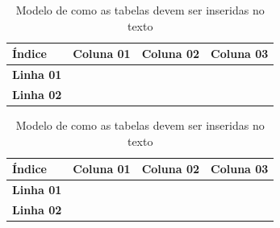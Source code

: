 \begin{table}[h]
\centering
\caption{ Modelo de como as tabelas devem ser inseridas no texto }
\vspace{0.2in}
%
\newcommand{\rowstyle}[1]{%
  \protected\gdef\currentrowstyle{#1}%
}
\begin{tabularx}{\textwidth}{>{\bf}C|C|C|C}
\hline 
\textbf {Índice} & \textbf{Coluna 01} &\textbf{ Coluna 02} & \textbf{Coluna 03} \\ \hline \hline
Linha 01 & & & \\ \hline
Linha 02 & & & \\ \hline                         

\end{tabularx}
\end{table}






\begin{table}[h]
\centering
\caption{ Modelo de como as tabelas devem ser inseridas no texto }
\vspace{0.2in}
%
\newcommand{\rowstyle}[1]{%
  \protected\gdef\currentrowstyle{#1}%
}
\begin{tabularx}{\textwidth}{>{\bf}C|C|C|C}
\hline 
\textbf {Índice} & \textbf{Coluna 01} &\textbf{ Coluna 02} & \textbf{Coluna 03} \\ \hline \hline
Linha 01 & & & \\ \hline
Linha 02 & & & \\ \hline                         

\end{tabularx}
\end{table}